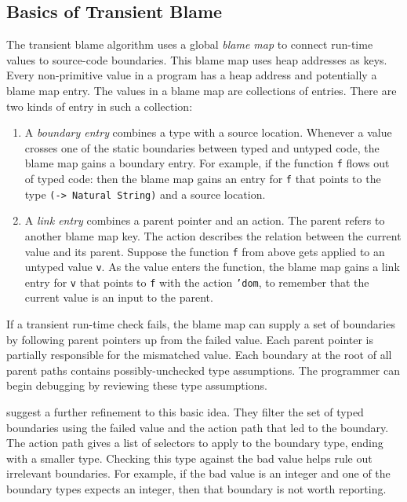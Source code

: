 \documentclass[ twoside,open=right,titlepage,numbers=noenddot,headinclude,%
                footinclude=true,cleardoublepage=empty,abstract=off,
                BCOR=5mm,paper=a4,fontsize=11pt,%
                ngerman,american,%
                parts,pdfspacing]{scrreprt}
\newcommand{\Scribtexttt}[1]{{\texttt{#1}}}
\newcommand{\Stttextmore}{{\fontencoding{T1}\selectfont>}}
\newlength{\stabLeft}
\newcommand{\atItemizeStart}[0]{\addtolength{\stabLeft}{\labelsep}
                                \addtolength{\stabLeft}{\labelwidth}}
\newcommand{\Ssubsubsection}[2]{\subsubsection[#1]{#2}}
\renewcommand{\Ssubsubsection}[2]{\subsection[#1]{#2}}
\begin{document}
\Ssubsubsection{Basics of Transient Blame}{Basics of Transient Blame}\label{t:x28part_x22Basicsx5fofx5fTransientx5fBlamex22x29}

The transient blame algorithm uses a global \emph{blame map} to connect
 run{-}time values to source{-}code boundaries.
This blame map uses heap addresses as keys.
Every non{-}primitive value in a program has a heap address and potentially
 a blame map entry.
The values in a blame map are collections of entries.
There are two kinds of entry in such a collection:


\noindent \begin{enumerate}\atItemizeStart

\item A \emph{boundary entry} combines a type with a source location.
Whenever a value crosses one of the static boundaries between typed
 and untyped code, the blame map gains a boundary entry.
For example, if the function \Scribtexttt{f} flows out of typed code:
then the blame map gains an entry for \Scribtexttt{f} that points to the
 type \Scribtexttt{({-}{\Stttextmore} Natural String)} and a source location.

\item A \emph{link entry} combines a parent pointer and an action.
The parent refers to another blame map key.
The action describes the relation between the current value and its parent.
Suppose the function \Scribtexttt{f} from above gets applied to an
 untyped value \Scribtexttt{v}.
As the value enters the function, the blame map gains a link entry
 for \Scribtexttt{v} that points to \Scribtexttt{f} with the action \Scribtexttt{}\Scribtexttt{{'}}\Scribtexttt{dom},
 to remember that the current value is an input to the parent.\end{enumerate}

If a transient run{-}time check fails, the blame map can supply a set
 of boundaries by following
 parent pointers up from the failed value.
Each parent pointer is partially responsible for the mismatched value.
Each boundary at the root of all parent paths contains possibly{-}unchecked
 type assumptions.
The programmer can begin debugging by reviewing these type assumptions.

 suggest a further refinement to this basic idea.
They filter the set of typed boundaries using the failed value and the
 action path that led to the boundary.
The action path gives a list of selectors to apply to the boundary type,
 ending with a smaller type.
Checking this type against the bad value helps rule out irrelevant boundaries.
For example, if the bad value is an integer and one of the boundary types expects an integer,
 then that boundary is not worth reporting.
\end{document}
